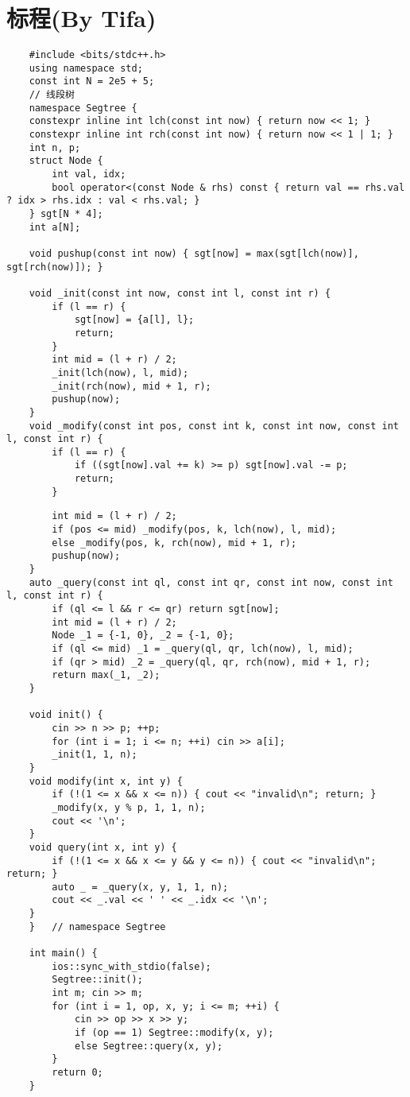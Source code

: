 \documentclass{ctsol}
\begin{document}
\section*{标程(By Tifa)}
\begin{lstlisting}
    #include <bits/stdc++.h>
    using namespace std;
    const int N = 2e5 + 5;
    // 线段树
    namespace Segtree {
    constexpr inline int lch(const int now) { return now << 1; }
    constexpr inline int rch(const int now) { return now << 1 | 1; }
    int n, p;
    struct Node {
        int val, idx;
        bool operator<(const Node & rhs) const { return val == rhs.val ? idx > rhs.idx : val < rhs.val; }
    } sgt[N * 4];
    int a[N];
    
    void pushup(const int now) { sgt[now] = max(sgt[lch(now)], sgt[rch(now)]); }

    void _init(const int now, const int l, const int r) {
        if (l == r) {
            sgt[now] = {a[l], l};
            return;
        }
        int mid = (l + r) / 2;
        _init(lch(now), l, mid);
        _init(rch(now), mid + 1, r);
        pushup(now);
    }
    void _modify(const int pos, const int k, const int now, const int l, const int r) {
        if (l == r) {
            if ((sgt[now].val += k) >= p) sgt[now].val -= p;
            return;
        }
\end{lstlisting}
\newpage
\begin{lstlisting}
        int mid = (l + r) / 2;
        if (pos <= mid) _modify(pos, k, lch(now), l, mid);
        else _modify(pos, k, rch(now), mid + 1, r);
        pushup(now);
    }
    auto _query(const int ql, const int qr, const int now, const int l, const int r) {
        if (ql <= l && r <= qr) return sgt[now];
        int mid = (l + r) / 2;
        Node _1 = {-1, 0}, _2 = {-1, 0};
        if (ql <= mid) _1 = _query(ql, qr, lch(now), l, mid);
        if (qr > mid) _2 = _query(ql, qr, rch(now), mid + 1, r);
        return max(_1, _2);
    }
    
    void init() {
        cin >> n >> p; ++p;
        for (int i = 1; i <= n; ++i) cin >> a[i];
        _init(1, 1, n);
    }
    void modify(int x, int y) {
        if (!(1 <= x && x <= n)) { cout << "invalid\n"; return; }
        _modify(x, y % p, 1, 1, n);
        cout << '\n';
    }
    void query(int x, int y) {
        if (!(1 <= x && x <= y && y <= n)) { cout << "invalid\n"; return; }
        auto _ = _query(x, y, 1, 1, n);
        cout << _.val << ' ' << _.idx << '\n';
    }
    }   // namespace Segtree

    int main() {
        ios::sync_with_stdio(false);
        Segtree::init();
        int m; cin >> m;
        for (int i = 1, op, x, y; i <= m; ++i) {
            cin >> op >> x >> y;
            if (op == 1) Segtree::modify(x, y);
            else Segtree::query(x, y);
        }
        return 0;
    }
\end{lstlisting}
\end{document}
